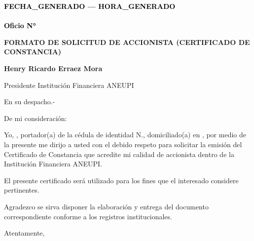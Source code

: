 \documentclass[a4paper,12pt]{article}
\begin{document}
\pagestyle{empty}

\vspace*{-5.5cm}
\begin{flushright}
{\footnotesize \textcolor{black}{\textbf{{{FECHA_GENERADO}} --- {{{HORA_GENERADO}}}}}} \\[-10pt] %
{\footnotesize \textcolor{black}{\underline{\hspace{7.5cm}}}} \\[-2pt] %
{\footnotesize \textcolor{black}{\textbf{Oficio N° }}} 
\end{flushright}
\vspace{2.5cm}
\noindent
\hspace*{\dimexpr\textwidth+1cm\relax}

\begin{center}
    \textbf{\large FORMATO DE SOLICITUD DE ACCIONISTA (CERTIFICADO DE CONSTANCIA) }
\end{center}

\vspace{0.8cm}

\noindent \textbf{Henry Ricardo Erraez Mora} 

\noindent Presidente Institución Financiera ANEUPI 

\noindent En su despacho.-

\vspace{1cm}

\noindent De mi consideración:

\noindent Yo, \textbf{\underline{\hspace{6cm}}}, portador(a) de la cédula de identidad N.\textbf{\underline{\hspace{4cm}}}, domiciliado(a) en \textbf{\underline{\hspace{6cm}}}, por medio de la presente me dirijo a usted con el debido respeto para solicitar la emisión del Certificado de Constancia que acredite mi calidad de accionista dentro de la Institución Financiera ANEUPI.

\vspace{0.5cm}

\noindent El presente certificado será utilizado para los fines que el interesado considere pertinentes.

\vspace{0.5cm}

\noindent Agradezco se sirva disponer la elaboración y entrega del documento correspondiente conforme a los registros institucionales.

\vspace{1cm}

\noindent Atentamente,

\vspace{2.5cm}


\noindent{}  

\noindent{}      

\noindent{}  

\noindent{} 
\end{document}

